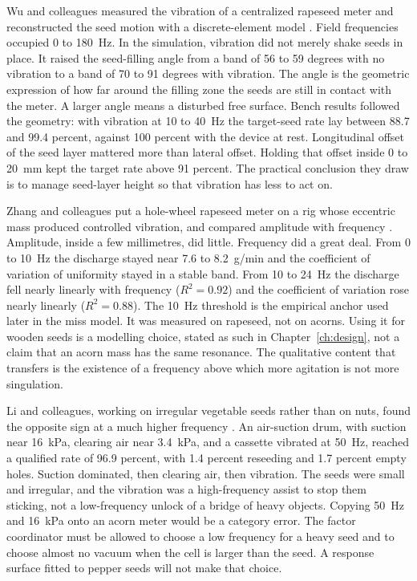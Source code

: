 Wu and colleagues measured the vibration of a centralized rapeseed meter and reconstructed the seed motion with a discrete-element model \cite{wu2022,cundall1979}. Field frequencies occupied 0 to 180~Hz. In the simulation, vibration did not merely shake seeds in place. It raised the seed-filling angle from a band of 56 to 59 degrees with no vibration to a band of 70 to 91 degrees with vibration. The angle is the geometric expression of how far around the filling zone the seeds are still in contact with the meter. A larger angle means a disturbed free surface. Bench results followed the geometry: with vibration at 10 to 40~Hz the target-seed rate lay between 88.7 and 99.4 percent, against 100 percent with the device at rest. Longitudinal offset of the seed layer mattered more than lateral offset. Holding that offset inside 0 to 20~mm kept the target rate above 91 percent. The practical conclusion they draw is to manage seed-layer height so that vibration has less to act on.

Zhang and colleagues put a hole-wheel rapeseed meter on a rig whose eccentric mass produced controlled vibration, and compared amplitude with frequency \cite{zhang2024vib}. Amplitude, inside a few millimetres, did little. Frequency did a great deal. From 0 to 10~Hz the discharge stayed near 7.6 to 8.2~g/min and the coefficient of variation of uniformity stayed in a stable band. From 10 to 24~Hz the discharge fell nearly linearly with frequency ($R^2=0.92$) and the coefficient of variation rose nearly linearly ($R^2=0.88$). The 10~Hz threshold is the empirical anchor used later in the miss model. It was measured on rapeseed, not on acorns. Using it for wooden seeds is a modelling choice, stated as such in Chapter~\ref{ch:design}, not a claim that an acorn mass has the same resonance. The qualitative content that transfers is the existence of a frequency above which more agitation is not more singulation.

Li and colleagues, working on irregular vegetable seeds rather than on nuts, found the opposite sign at a much higher frequency \cite{li2025drum}. An air-suction drum, with suction near 16~kPa, clearing air near 3.4~kPa, and a cassette vibrated at 50~Hz, reached a qualified rate of 96.9 percent, with 1.4 percent reseeding and 1.7 percent empty holes. Suction dominated, then clearing air, then vibration. The seeds were small and irregular, and the vibration was a high-frequency assist to stop them sticking, not a low-frequency unlock of a bridge of heavy objects. Copying 50~Hz and 16~kPa onto an acorn meter would be a category error. The factor coordinator must be allowed to choose a low frequency for a heavy seed and to choose almost no vacuum when the cell is larger than the seed. A response surface fitted to pepper seeds will not make that choice.

